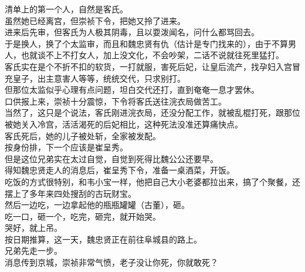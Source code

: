 \begin{multicols}{\theparacolNo}
清单上的第一个人，自然是客氏。\\

虽然她已经离宫，但崇祯下令，把她又拎了进来。\\

进来后先审，但客氏为人极其阴毒，且以耍泼闻名，问什么都骂回去。\\

于是换人，换了个太监审，而且和魏忠贤有仇（估计是专门找来的），由于不算男人，也就谈不上不打女人，加上没文化，不会吵架，二话不说就往死里猛打。\\

客氏实在是个不折不扣的软货，一打就服，害死后妃，让皇后流产，找孕妇入宫冒充皇子，出主意害人等等，统统交代，只求别打。\\

但那位太监似乎心理有点问题，坦白交代还打，直到奄奄一息才罢休。\\

口供报上来，崇祯十分震惊，下令将客氏送往浣衣局做苦工。\\

当然了，这只是个说法，客氏刚进浣衣局，还没分配工作，就被乱棍打死，跟那位被她关入冷宫，活活渴死的后妃相比，这种死法没准还算痛快点。\\

客氏死后，她的儿子被处斩，全家被发配。\\

按身份排，下一个应该是崔呈秀。\\

但是这位兄弟实在太过自觉，自觉到死得比魏公公还要早。\\

得知魏忠贤走人的消息后，崔呈秀下令，准备一桌酒菜，开饭。\\

吃饭的方式很特别，和韦小宝一样，他把自己大小老婆都拉出来，搞了个聚餐，还摆上了多年来四处搜刮的古玩财宝。\\

然后一边吃，一边拿起他的瓶瓶罐罐（古董），砸。\\

吃一口，砸一个，吃完，砸完，就开始哭。\\

哭好，就上吊。\\

按日期推算，这一天，魏忠贤正在前往阜城县的路上。\\

兄弟先走一步。\\

消息传到京城，崇祯非常气愤，老子没让你死，你就敢死？\\


\end{multicols}
